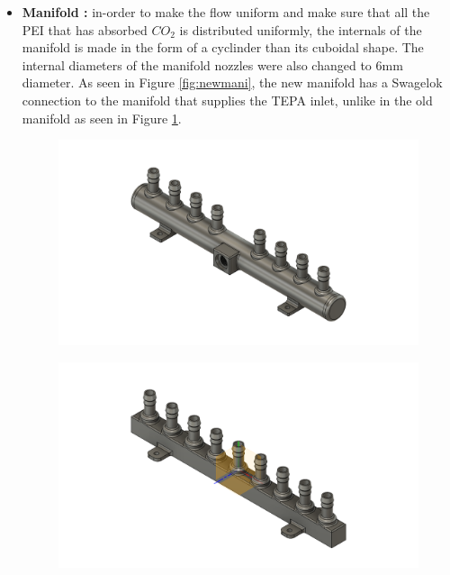 \begin{itemize}
    \item \textbf{Manifold :} in-order to make the flow uniform and make sure that all the PEI that has absorbed $CO_2$ is distributed uniformly, the internals of the manifold is made in the form of a cyclinder than its cuboidal shape. The internal diameters of the manifold nozzles were also changed to 6mm diameter. As seen in Figure \ref{fig:newmani}, the new manifold has a Swagelok connection to the manifold that supplies the TEPA inlet, unlike in the old manifold as seen in Figure \ref{fig:oldmani}.
    
    
        \begin{figure}[H]
        \centering
        \begin{minipage}{.5\textwidth}
        \centering
        \includegraphics[width=\linewidth]{images/mywork/Sprint4/Manifold_main.png}
         \label{fig:newmani}
    \end{minipage}%
    \begin{minipage}{.5\textwidth}
        \centering
        \includegraphics[width=\linewidth]{images/mywork/Sprint4/Manifold_old.png}
        \label{fig:oldmani}
    \end{minipage}
    \end{figure}
    

\end{itemize}
